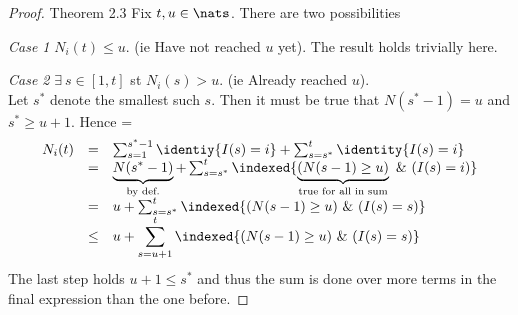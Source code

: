 \documentclass[11pt,a4paper]{article}
\begin{document}
  \begin{proof}{Theorem 2.3}
    Fix $t,u\in\nats$. There are two possibilities
    \par\textit{Case 1} $N_i(t)\leq u$. (ie Have not reached $u$ yet). The result holds trivially here.

    \par\textit{Case 2} $\exists\ s\in[1,t]$ st $N_i(s)>u$. (ie Already reached $u$).\\
    Let $s^*$ denote the smallest such $s$. Then it must be true that $N(s^*-1)=u$ and $s^*\geq u+1$. Hence
    \everymath={\displaystyle}
    \[\begin{array}{rcl}
      N_i(t)&=&\sum_{s=1}^{s^*-1}\identiy{I(s)=i}+\sum_{s=s^*}^t\identity{I(s)=i}\\
      &=&\underbrace{N(s^*-1)}_{\tiny\text{by def.}}+\sum_{s=s^*}^t\indexed\{\underbrace{(N(s-1)\geq u)}_{\tiny\text{true for all in sum}}\ \&\ (I(s)=i)\}\\
      &=&u+\sum_{s=s^*}^t\indexed\{(N(s-1)\geq u)\ \&\ (I(s)=s)\}\\
      &\leq&\displaystyle u+\sum_{s=u+1}^t\indexed\{(N(s-1)\geq u)\ \&\ (I(s)=s)\}
    \end{array}\]
    The last step holds $u+1\leq s^*$ and thus the sum is done over more terms in the final expression than the one before.
    \proved
  \end{proof}
\end{document}
